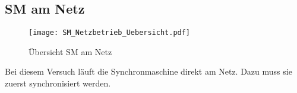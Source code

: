 \begin{flushleft}






\newpage
{}  %
\section{SM am Netz}\label{netz}

\vspace{0.3cm}
\begin{figure}[H]
    \centering
        \texttt{[image: SM\_Netzbetrieb\_Uebersicht.pdf]}
    \caption{Übersicht SM am Netz}
    \label{fig:SMNetz}
\end{figure}\vspace{0.3cm}
 Bei diesem Versuch läuft die Synchronmaschine direkt am Netz. Dazu muss sie zuerst synchronisiert werden. 


\end{flushleft}
